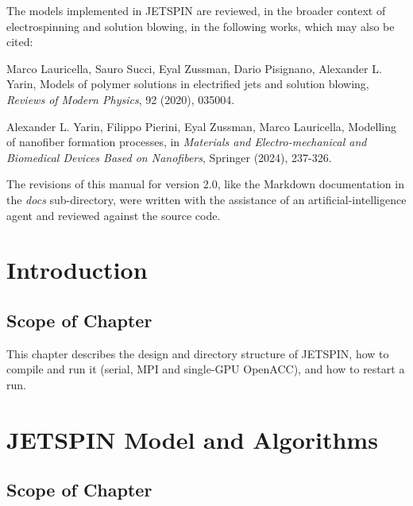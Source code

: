 \documentclass[oneside,english]{book}
\begin{document}
The models implemented in JETSPIN are reviewed, in the broader context of
electrospinning and solution blowing, in the following works, which may
also be cited:

Marco Lauricella, Sauro Succi, Eyal Zussman, Dario Pisignano, Alexander L.
Yarin, Models of polymer solutions in electrified jets and solution
blowing, \textit{Reviews of Modern Physics}, 92 (2020), 035004.

Alexander L. Yarin, Filippo Pierini, Eyal Zussman, Marco Lauricella,
Modelling of nanofiber formation processes, in \textit{Materials and
Electro-mechanical and Biomedical Devices Based on Nanofibers}, Springer
(2024), 237-326.

The revisions of this manual for version 2.0, like the Markdown
documentation in the \textit{docs} sub-directory, were written with the
assistance of an artificial-intelligence agent and reviewed against the
source code.

\newpage{} \tableofcontents{}

\newpage{}

\chapter{Introduction\label{chap:Introduction}}

\section*{Scope of Chapter}

This chapter describes the design and directory structure of JETSPIN, how
to compile and run it (serial, MPI and single-GPU OpenACC), and how to
restart a run.













\newpage{}

\chapter{JETSPIN Model and Algorithms\label{chap:JETSPIN-Model-and}}

\section*{Scope of Chapter}
\end{document}
